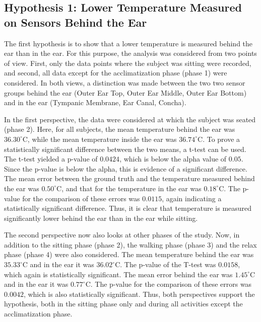 \subsection{Hypothesis 1: Lower Temperature Measured on Sensors Behind the Ear}
\label{subsec:Evaluation:Study1:Hypothesis1}

The first hypothesis is to show that a lower temperature is measured behind the ear than in the ear.
For this purpose, the analysis was considered from two points of view. 
First, only the data points where the subject was sitting were recorded, and second, all data except for the acclimatization phase (phase 1) were considered.
In both views, a distinction was made between the two two sensor groups behind the ear (Outer Ear Top, Outer Ear Middle, Outer Ear Bottom) and in the ear (Tympanic Membrane, Ear Canal, Concha). 

In the first perspective, the data were considered at which the subject was seated (phase 2). 
Here, for all subjects, the mean temperature behind the ear was \(36.30^\circ\text{C}\), while the mean temperature inside the ear was \(36.74^\circ\text{C}\). 
To prove a statistically significant difference between the two means, a t-test can be used.
The t-test yielded a p-value of \(0.0424\), which is below the alpha value of \(0.05\).
Since the p-value is below the alpha, this is evidence of a significant difference.
The mean error between the ground truth and the temperature measured behind the ear was \(0.50^\circ\text{C}\), and that for the temperature in the ear was \(0.18^\circ\text{C}\). 
The p-value for the comparison of these errors was \(0.0115\), again indicating a statistically significant difference.
Thus, it is clear that temperature is measured significantly lower behind the ear than in the ear while sitting.

The second perspective now also looks at other phases of the study. 
Now, in addition to the sitting phase (phase 2), the walking phase (phase 3) and the relax phase (phase 4) were also considered. 
The mean temperature behind the ear was \(35.33^\circ\text{C}\) and in the ear it was \(36.02^\circ\text{C}\). 
The p-value of the T-test was \(0.0158\), which again is statistically significant.
The mean error behind the ear was \(1.45^\circ\text{C}\) and in the ear it was \(0.77^\circ\text{C}\). 
The p-value for the comparison of these errors was \(0.0042\), which is also statistically significant.
Thus, both perspectives support the hypothesis, both in the sitting phase only and during all activities except the acclimatization phase.

